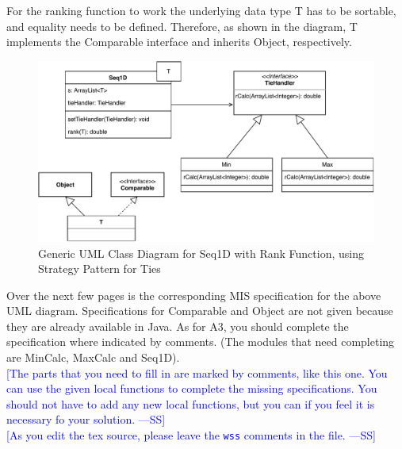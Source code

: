 \documentclass[12pt,fleqn]{examtst}
\newcommand{\authornote}[3]{\textcolor{#1}{[#3 ---#2]}}
\newcommand{\authornote}[3]{}
\newcommand{\wss}[1]{\authornote{blue}{SS}{#1}}
\begin{document}
For the ranking function to work the underlying data type T has to be sortable,
and equality needs to be defined.  Therefore, as shown in the diagram, T
implements the Comparable interface and inherits Object, respectively.

\begin{figure}[!h]
\begin{center}
\includegraphics[scale=1]{Seq1D_StratPattern_UML.pdf}
\end{center}
\caption{Generic UML Class Diagram for Seq1D with Rank Function, using Strategy Pattern
  for Ties} \label{Fig_UML_Strategy}
\end{figure}

 
\newpage

\noindent
\begin{minipage}{\textwidth}
 \label{Q_CompleteMIS}

Over the next few pages is the corresponding MIS specification for the above UML
diagram.  Specifications for Comparable and Object are not given because they
are already available in Java.  As for A3, you should complete the specification
where indicated by comments.  (The modules that need completing are MinCalc,
MaxCalc and Seq1D).\\

\wss{The parts that you need to fill in are marked by comments, like this one.
You can use the given local functions to complete the missing specifications.
You should not have to add any new local functions, but you can if you feel it
is necessary fo your solution.}\\

\wss{As you edit the tex source, please leave the \texttt{wss} comments in the
  file.}\\

\end{minipage}
\end{document}
